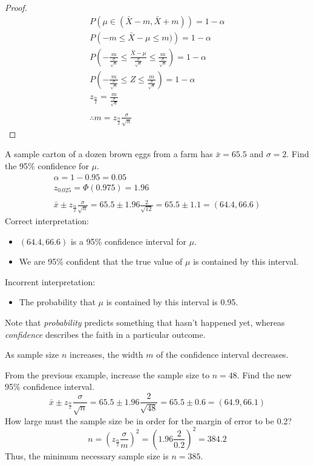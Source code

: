\documentclass[letterpaper,12pt,fleqn]{article}
\renewcommand{\a}{\alpha}
\newcommand{\m}{\mu}
\renewcommand{\o}{\sigma}
\newcommand{\z}[1]{z_{#1}}
\newcommand{\zdt}{\z{\frac{\a}{2}}}
\renewcommand{\P}{\Phi}
\begin{document}
\begin{proof}
  \begin{gather*}
    P\left(\m\in(\bar{X}-m,\bar{X}+m)\right)=1-\a \\
    P\left(-m\le\bar{X}-\m\le m)\right)=1-\a \\
    P\left(-\frac{m}{\frac{\o}{\sqrt{n}}}\le\frac{\bar{X}-\m}{\frac{\o}{\sqrt{n}}}\le
    \frac{m}{\frac{\o}{\sqrt{n}}}\right)=1-\a \\
    P\left(-\frac{m}{\frac{\o}{\sqrt{n}}}\le Z\le\frac{m}{\frac{\o}{\sqrt{n}}}\right)=1-\a \\
    \zdt=\frac{m}{\frac{\o}{\sqrt{n}}} \\
    \\
    \therefore m=\zdt\frac{\o}{\sqrt{n}}
  \end{gather*}
\end{proof}

\begin{example}
  A sample carton of a dozen brown eggs from a farm has \(\bar{x}=65.5\) and \(\o=2\).  Find the 95\% confidence for \(\m\).
  \begin{gather*}
    \a=1-0.95=0.05 \\
    \z{0.025}=\P(0.975)=1.96 \\
    \\
    \bar{x}\pm\zdt\frac{\o}{\sqrt{n}}=65.5\pm1.96\frac{2}{\sqrt{12}}=65.5\pm1.1=(64.4,66.6)
  \end{gather*}
  Correct interpretation:
  \begin{itemize}
  \item \((64.4,66.6)\) is a 95\% confidence interval for \(\m\).
  \item We are 95\% confident that the true value of \(\m\) is contained by this interval.
  \end{itemize}

  Incorrent interpretation:
  \begin{itemize}
    \item The probability that \(\m\) is contained by this interval is 0.95.
  \end{itemize}
\end{example}

Note that \emph{probability} predicts something that hasn't happened yet, whereas \emph{confidence} describes the faith in a
particular outcome.

As sample size \(n\) increases, the width \(m\) of the confidence interval decreases.

\begin{example}
  From the previous example, increase the sample size to \(n=48\).  Find the new 95\% confidence interval.
  \[\bar{x}\pm\zdt\frac{\o}{\sqrt{n}}=65.5\pm1.96\frac{2}{\sqrt{48}}=65.5\pm0.6=(64.9,66.1)\]
  How large must the sample size be in order for the margin of error to be 0.2?
  \[n=\left(\zdt\frac{\o}{m}\right)^2=\left(1.96\frac{2}{0.2}\right)^2=384.2\]
  Thus, the minimum necessary sample size is \(n=385\).
\end{example}
\end{document}
